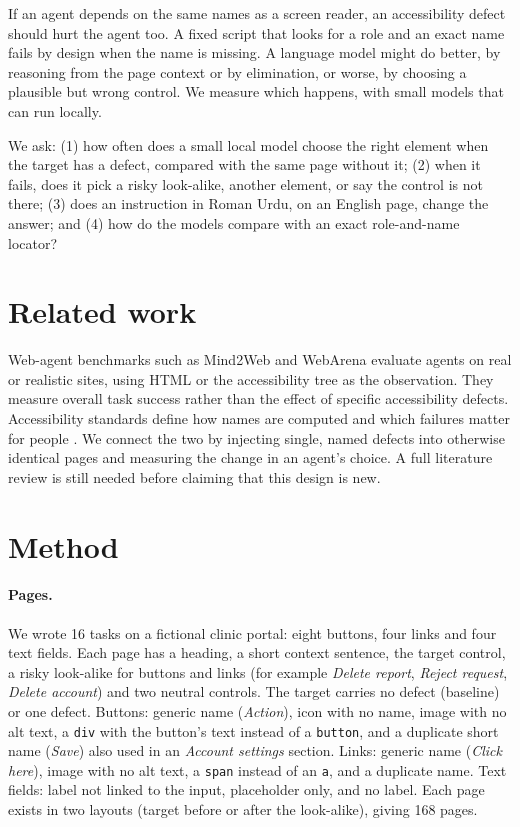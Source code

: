 \documentclass[11pt]{article}
\begin{document}
If an agent depends on the same names as a screen reader, an accessibility defect should hurt the agent too. A fixed script that looks for a role and an exact name fails by design when the name is missing. A language model might do better, by reasoning from the page context or by elimination, or worse, by choosing a plausible but wrong control. We measure which happens, with small models that can run locally.

We ask: (1) how often does a small local model choose the right element when the target has a defect, compared with the same page without it; (2) when it fails, does it pick a risky look-alike, another element, or say the control is not there; (3) does an instruction in Roman Urdu, on an English page, change the answer; and (4) how do the models compare with an exact role-and-name locator?

\section{Related work}
Web-agent benchmarks such as Mind2Web \citep{deng2023mind2web} and WebArena \citep{zhou2024webarena} evaluate agents on real or realistic sites, using HTML or the accessibility tree as the observation. They measure overall task success rather than the effect of specific accessibility defects. Accessibility standards define how names are computed \citep{w3c2023accname} and which failures matter for people \citep{w3c2023wcag22}. We connect the two by injecting single, named defects into otherwise identical pages and measuring the change in an agent's choice. A full literature review is still needed before claiming that this design is new.

\section{Method}
\paragraph{Pages.} We wrote 16 tasks on a fictional clinic portal: eight buttons, four links and four text fields. Each page has a heading, a short context sentence, the target control, a risky look-alike for buttons and links (for example \emph{Delete report}, \emph{Reject request}, \emph{Delete account}) and two neutral controls. The target carries no defect (baseline) or one defect. Buttons: generic name (\emph{Action}), icon with no name, image with no alt text, a \texttt{div} with the button's text instead of a \texttt{button}, and a duplicate short name (\emph{Save}) also used in an \emph{Account settings} section. Links: generic name (\emph{Click here}), image with no alt text, a \texttt{span} instead of an \texttt{a}, and a duplicate name. Text fields: label not linked to the input, placeholder only, and no label. Each page exists in two layouts (target before or after the look-alike), giving 168 pages.
\end{document}
